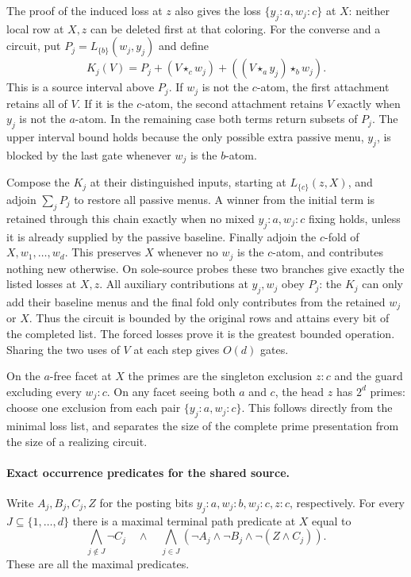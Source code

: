 The proof of the induced loss at $z$ also gives
the loss $\{y_j:a,w_j:c\}$ at $X$: neither local
row at $X,z$ can be deleted first at that coloring.
For the converse and a circuit, put
$P_j=L_{\{b\}}(w_j,y_j)$ and define
\[
 K_j(V)=P_j+(V\star_c w_j)
                +((V\star_a y_j)\star_b w_j).
\]
This is a source interval above $P_j$. If $w_j$
is not the $c$-atom, the first attachment retains
all of $V$. If it is the $c$-atom, the second
attachment retains $V$ exactly when $y_j$ is not
the $a$-atom. In the remaining case both terms
return subsets of $P_j$. The upper interval
bound holds because the only possible extra
passive menu, $y_j$, is blocked by the last
gate whenever $w_j$ is the $b$-atom.

Compose the $K_j$ at their distinguished
inputs, starting at $L_{\{c\}}(z,X)$, and
adjoin $\sum_j P_j$ to restore all passive
menus. A winner from the initial term is
retained through this chain exactly when
no mixed $y_j:a,w_j:c$ fixing holds, unless
it is already supplied by the passive
baseline. Finally adjoin the $c$-fold of
$X,w_1,\ldots,w_d$. This preserves $X$
whenever no $w_j$ is the $c$-atom, and
contributes nothing new otherwise.
On sole-source probes these two branches
give exactly the listed losses at $X,z$.
All auxiliary contributions at $y_j,w_j$
obey $P_j$: the $K_j$ can only add their
baseline menus and the final fold only
contributes from the retained $w_j$ or $X$.
Thus the circuit is bounded by the original
rows and attains every bit of the completed
list. The forced losses prove it is the
greatest bounded operation. Sharing the
two uses of $V$ at each step gives $O(d)$
gates.

On the $a$-free facet at $X$ the primes are
the singleton exclusion $z:c$ and the guard
excluding every $w_j:c$. On any facet
seeing both $a$ and $c$, the head $z$ has
$2^d$ primes: choose one exclusion from
each pair $\{y_j:a,w_j:c\}$. This follows
directly from the minimal loss list, and
separates the size of the complete prime
presentation from the size of a realizing
circuit.

\paragraph{Exact occurrence predicates for the shared source.}
Write $A_j,B_j,C_j,Z$ for the posting bits
$y_j:a,w_j:b,w_j:c,z:c$, respectively.
For every $J\subseteq\{1,\ldots,d\}$ there is
a maximal terminal path predicate at $X$ equal to
\[
 \bigwedge_{j\notin J}\neg C_j
 \quad\land\quad
 \bigwedge_{j\in J}(\neg A_j\land\neg B_j
                         \land\neg(Z\land C_j)).
\]
These are all the maximal predicates.

